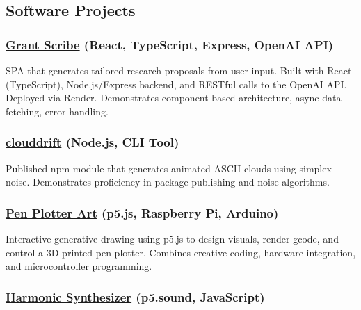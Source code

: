 \documentclass[11pt,a4paper]{article}
\begin{document}
\subsection{Software Projects}\label{software-projects}

\subsubsection{\texorpdfstring{\href{https://github.com/thrly/grant-scribe}{Grant
Scribe} (React, TypeScript, Express, OpenAI
API)}{Grant Scribe (React, TypeScript, Express, OpenAI API)}}\label{grant-scribe-react-typescript-express-openai-api}

SPA that generates tailored research proposals from user input. Built
with React (TypeScript), Node.js/Express backend, and RESTful calls to
the OpenAI API. Deployed via Render. Demonstrates component-based
architecture, async data fetching, error handling.

\subsubsection{\texorpdfstring{\href{https://github.com/thrly/clouddrift}{clouddrift}
(Node.js, CLI
Tool)}{clouddrift (Node.js, CLI Tool)}}\label{clouddrift-node.js-cli-tool}

Published npm module that generates animated ASCII clouds using simplex
noise. Demonstrates proficiency in package publishing and noise
algorithms.

\subsubsection{\texorpdfstring{\href{https://github.com/thrly/pen-plotter-art}{Pen
Plotter Art} (p5.js, Raspberry Pi,
Arduino)}{Pen Plotter Art (p5.js, Raspberry Pi, Arduino)}}\label{pen-plotter-art-p5.js-raspberry-pi-arduino}

Interactive generative drawing using p5.js to design visuals, render
gcode, and control a 3D-printed pen plotter. Combines creative coding,
hardware integration, and microcontroller programming.

\subsubsection{\texorpdfstring{\href{https://github.com/thrly/harmonic-synth}{Harmonic
Synthesizer} (p5.sound,
JavaScript)}{Harmonic Synthesizer (p5.sound, JavaScript)}}\label{harmonic-synthesizer-p5.sound-javascript}
\end{document}
